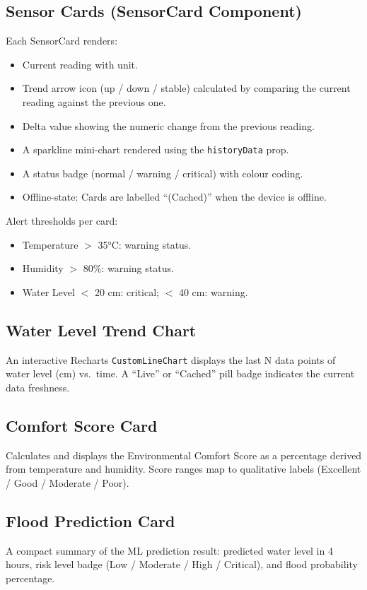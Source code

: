 \subsection{Sensor Cards (SensorCard Component)}

Each SensorCard renders:
\begin{itemize}[leftmargin=1.5em]
  \item Current reading with unit.
  \item Trend arrow icon (up / down / stable) calculated by comparing the current reading against the previous one.
  \item Delta value showing the numeric change from the previous reading.
  \item A sparkline mini-chart rendered using the \texttt{historyData} prop.
  \item A status badge (normal / warning / critical) with colour coding.
  \item Offline-state: Cards are labelled ``(Cached)'' when the device is offline.
\end{itemize}

Alert thresholds per card:
\begin{itemize}[leftmargin=1.5em]
  \item Temperature $>$ 35°C: warning status.
  \item Humidity $>$ 80\%: warning status.
  \item Water Level $<$ 20 cm: critical; $<$ 40 cm: warning.
\end{itemize}

\subsection{Water Level Trend Chart}
An interactive Recharts \texttt{CustomLineChart} displays the last N data points of water level (cm) vs.\ time. A ``Live'' or ``Cached'' pill badge indicates the current data freshness.

\subsection{Comfort Score Card}
Calculates and displays the Environmental Comfort Score as a percentage derived from temperature and humidity. Score ranges map to qualitative labels (Excellent / Good / Moderate / Poor).

\subsection{Flood Prediction Card}
A compact summary of the ML prediction result: predicted water level in 4 hours, risk level badge (Low / Moderate / High / Critical), and flood probability percentage.

